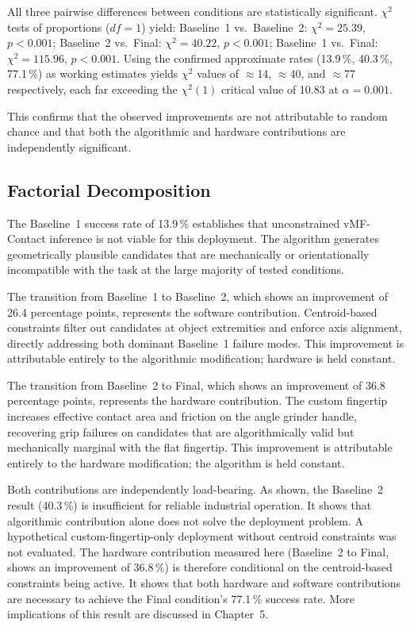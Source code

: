\documentclass[12pt, a4paper]{report}
\begin{document}
All three pairwise differences between conditions are statistically significant. 
$\chi^2$ tests of proportions ($df = 1$) yield: 
Baseline~1 vs.\ Baseline~2: $\chi^2 = 25.39$, $p < 0.001$; 
Baseline~2 vs.\ Final: $\chi^2 = 40.22$, $p < 0.001$; 
Baseline~1 vs.\ Final: $\chi^2 = 115.96$, $p < 0.001$. 
Using the confirmed approximate rates (13.9\,\%, 40.3\,\%, 77.1\,\%) as working estimates yields $\chi^2$ values of $\approx$14, $\approx$40, and $\approx$77 respectively, 
each far exceeding the $\chi^2(1)$ critical value of 10.83 at $\alpha = 0.001$.

This confirms that the observed improvements are not attributable to random chance and that both the algorithmic and hardware contributions are independently significant.

\subsection{Factorial Decomposition}
\label{sec:factorial-decomposition}

The Baseline~1 success rate of 13.9\,\% establishes that unconstrained vMF-Contact inference is not viable for this deployment. The algorithm generates geometrically plausible candidates that are mechanically or orientationally incompatible with the task at the large majority of tested conditions. 

The transition from Baseline~1 to Baseline~2, which shows an improvement of 26.4 percentage points, represents the software contribution. Centroid-based constraints filter out candidates at object extremities and enforce axis alignment, directly addressing both dominant Baseline~1 failure modes. This improvement is attributable entirely to the algorithmic modification; hardware is held constant.

The transition from Baseline~2 to Final, which shows an improvement of 36.8 percentage points, represents the hardware contribution. The custom fingertip increases effective contact area and friction on the angle grinder handle, recovering grip failures on candidates that are algorithmically valid but mechanically marginal with the flat fingertip. This improvement is attributable entirely to the hardware modification; the algorithm is held constant.

Both contributions are independently load-bearing. As shown, the Baseline~2 result (40.3\,\%) is insufficient for reliable industrial operation. It shows that algorithmic contribution alone does not solve the deployment problem. A hypothetical custom-fingertip-only deployment without centroid constraints was not evaluated. The hardware contribution measured here (Baseline~2 to Final, shows an improvement of 36.8\,\%) is therefore conditional on the centroid-based constraints being active. It shows that both hardware and software contributions are necessary to achieve the Final condition's 77.1\,\% success rate. More implications of this result are discussed in Chapter~5.
\end{document}
